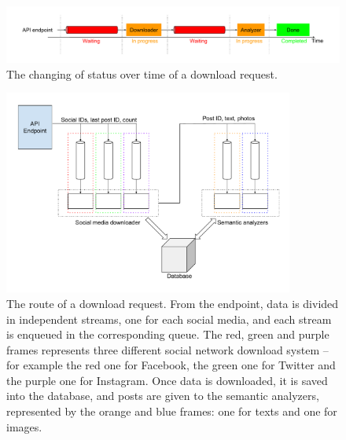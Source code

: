 \begin{figure}
\centering
\includegraphics[width=%
1\textwidth]{img/DownloadStatuses}
\caption{The changing of status over time of a download request.}
\label{fig:statuses}
\end{figure}

\begin{figure}
\centering
\includegraphics[width=%
0.85\textwidth]{img/Queues}
\caption{The route of a download request. From the endpoint, data is divided in independent streams, one for each social media, and each stream is enqueued in the corresponding queue. The red, green and purple frames represents three different social network download system -- for example the red one for Facebook, the green one for Twitter and the purple one for Instagram. Once data is downloaded, it is saved into the database, and posts are given to the semantic analyzers, represented by the orange and blue frames: one for texts and one for images.}
\label{fig:queues}
\end{figure}

